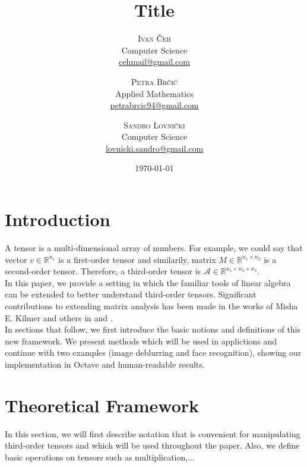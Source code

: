 \documentclass[twoside]{article}
\title{Title} %
\author{%
\textsc{Ivan \v{C}eh}\\%
\normalsize Computer Science \\
\normalsize \href{mailto:cehmail@gmail.com}{cehmail@gmail.com} 
\and
\textsc{Petra Br\v{c}i\'c}\\%
\normalsize Applied Mathematics \\
\normalsize \href{mailto:petrabrcic94@gmail.com}{petrabrcic94@gmail.com} 
\and
\textsc{Sandro Lovni\v{c}ki}\\%
\normalsize Computer Science \\ 
\normalsize \href{mailto:lovnicki.sandro@gmail.com}{lovnicki.sandro@gmail.com}
}
\date{\today}
\begin{document}
\maketitle

\begin{multicols}{2}

\section{Introduction}
A tensor is a multi-dimensional array of numbers. For example, we could say that vector $v \in \mathbb{R}^{n_1}$ is a first-order tensor and similarily, matrix $M \in \mathbb{R}^{n_1 \times n_2}$ is a second-order tensor. Therefore, a third-order tensor is $\mathcal{A} \in \mathbb{R}^{n_1 \times n_2 \times n_3}$.\\
\indent In this paper, we provide a setting in which the familiar tools of linear algebra can be extended to better understand third-order tensors. Significant contributions to extending matrix analysis has been made in the works of Misha E. Kilmer and others in \cite{kilmer-braman-hao} and \cite{kilmer-martin}.\\
\indent In sections that follow, we first introduce the basic notions and definitions of this new framework. We present methods which will be used in applictions and continue with two examples (image deblurring and face recognition), showing our implementation in Octave and human-readable results.

\section{Theoretical Framework}
In this section, we will first describe notation that is convenient for manipulating third-order tensors and which will be used throughout the paper. Also, we define basic operations on tensors such as multiplication,...


\end{multicols}
\end{document}
